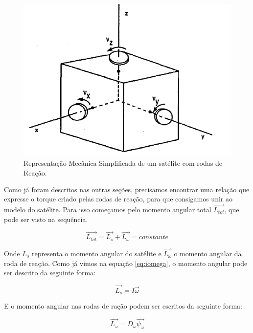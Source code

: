 \begin{figure}[!ht]
  \caption{Representação Mecânica Simplificada de um satélite com rodas de Reação.}
  \begin{center}
      \includegraphics[scale=0.75]{img/satellite_controlhand_p1306}
  \end{center}
  \label{fig:satellite_controlhand_p1306}
\end{figure}

Como já foram descritos nas outras seções, precisamos encontrar uma relação que expresse o torque criado pelas rodas de reação, para que consigamos unir ao modelo do satélite. Para isso começamos pelo momento angular total $\vec{L_{tot}}$, que pode ser visto na sequência.

\begin{equation}\label{eq:ltot}
\vec{L_{tot}}=\vec{L_s}+\vec{L_{\omega}}=constante 
\end{equation}

Onde $L_s$ representa o momento angular do satélite e $\vec{L_{\omega}}$ o momento angular da roda de reação. Como já vimos na equação \ref{eq:iomega}, o momento angular pode ser descrito da seguinte forma:

\begin{equation}
\vec{L_s}=I\vec{\omega}
\end{equation}

E o momento angular nas rodas de ração podem ser escritos da seguinte forma:

\begin{equation}
\vec {L_{\omega} } =D_{\omega}\vec{\psi_{\omega}} 
\end{equation}

